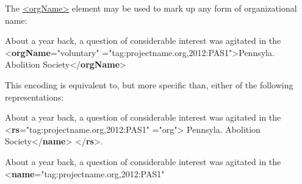 The \hyperref[TEI.orgName]{<orgName>} element may be used to mark up any form of organizational name: \par\bgroup{}\exampleFont \begin{shaded}\noindent\mbox{}About a year back, a question of considerable interest\mbox{}\newline 
 was agitated in the {<\textbf{orgName}\hspace*{1em}{type}="{voluntary}"\mbox{}\newline 
\hspace*{1em}{ref}="{tag:projectname.org,2012:PAS1}">}Pennsyla. Abolition\mbox{}\newline 
 Society{</\textbf{orgName}>}\end{shaded}\egroup\par \noindent  This encoding is equivalent to, but more specific than, either of the following representations: \par\bgroup{}\exampleFont \begin{shaded}\noindent\mbox{}About a year back, a question of considerable interest\mbox{}\newline 
 was agitated in the {<\textbf{rs}\hspace*{1em}{ref}="{tag:projectname.org,2012:PAS1}"\mbox{}\newline 
\hspace*{1em}{type}="{org}">}\mbox{}\newline 
{}Pennsyla. Abolition Society{</\textbf{name}>}\mbox{}\newline 
{</\textbf{rs}>}.\end{shaded}\egroup\par \noindent  \par\bgroup{}\exampleFont \begin{shaded}\noindent\mbox{}About a year back, a question of considerable interest was agitated in the\mbox{}\newline 
{<\textbf{name}\hspace*{1em}{ref}="{tag:projectname.org,2012:PAS1}"\mbox{}\newline 
}
\end{shaded}
